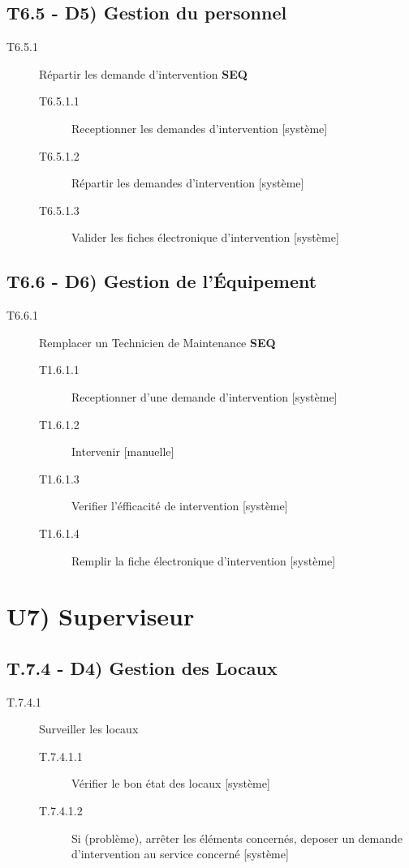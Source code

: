 	\subsection{T6.5 - D5) Gestion du personnel}
	\begin{description}
	\item[T6.5.1] Répartir les demande d'intervention \textbf{SEQ}
		\begin{description}
		\item[T6.5.1.1] Receptionner les demandes d'intervention [système]
		\item[T6.5.1.2] Répartir les demandes d'intervention [système]
		\item[T6.5.1.3] Valider les fiches électronique d'intervention [système]
		\end{description}
	\end{description}
	
	\subsection{T6.6 - D6) Gestion de l'Équipement}
	\begin{description}
		\item[T6.6.1] Remplacer un Technicien de Maintenance \textbf{SEQ}
		\begin{description}
			\item[T1.6.1.1] Receptionner d'une demande d'intervention [système]
			\item[T1.6.1.2] Intervenir [manuelle]
			\item[T1.6.1.3] Verifier l'éfficacité de intervention [système]
			\item[T1.6.1.4] Remplir la fiche électronique d'intervention [système]
		\end{description}
	\end{description}

\section{U7) Superviseur}
	\subsection{T.7.4 - D4) Gestion des Locaux}
	\begin{description}
	\item[T.7.4.1] Surveiller les locaux
		\begin{description}
		\item[T.7.4.1.1] Vérifier le bon état des locaux [système]
		\item[T.7.4.1.2] Si (problème), arrêter les éléments concernés, deposer un
		demande d'intervention au service concerné [système]
		\end{description}
	\end{description}

